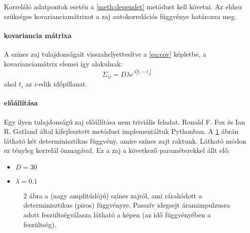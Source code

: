 Korreláló adatpontok esetén a \ref{meth:dependet} metódust kell követni. Az ehhez szükséges kovarianciamátrixot a zaj autokorrelációs függvénye határozza meg.

\paragraph{kovariancia mátrixa}
A színes zaj tulajdonságait visszahelyettesítve a \ref{eq:cov} képletbe, a kovarianciamátrix elemei így alakulnak:
\begin{equation}\label{eq:covmat_col}
	\Sigma_{ij} = D\lambda e^{\lambda |t_i - t_j|}
\end{equation}
ahol $t_i$ az $i$-edik időpillanat.

\paragraph{előállítása}
Egy ilyen tulajdonságú zaj előállítása nem triviális feladat. Ronald F. Fox és Ian R. Gatland által kifejlesztett metódust \cite{PhysRevA.38.5938} implementáltuk Pythonban.
A \ref{fig:colored} ábrán látható két determinisztikus függvény, amire színes zajt raktunk. Látható módon ez tényleg korrelál önmagával. Ez a zaj a következő paraméterekkel állt elő:
\begin{itemize}
	\item $D = 30$
	\item $\lambda = 0.1$
\end{itemize}

\begin{figure}
	\hfill
	\hfill
	\hfill
	\caption[Színes zaj]{2 ábra a (nagy amplitúdójú) színes zajról, ami rárakódott a determinisztikus (piros) függvényre. Passzív idegsejt áramimpulzusra adott feszültségválasza látható a képen (az idő függvényében a feszültség).}%
	\label{fig:colored}
\end{figure}

\FloatBarrier